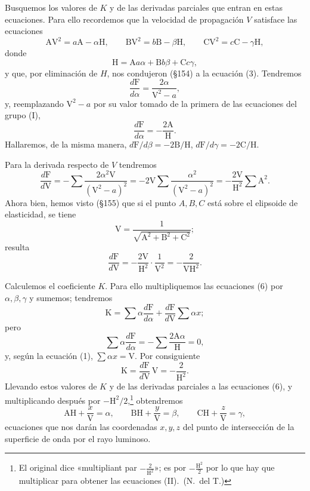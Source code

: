 Busquemos los valores de $K$ y de las
derivadas parciales que entran en estas ecuaciones. Para ello recordemos
que la velocidad de propagación $V$ satisface las ecuaciones
\begin{equation}
\mathrm{AV}^2=a\mathrm A-\alpha\mathrm H,\qquad
\mathrm{BV}^2=b\mathrm B-\beta\mathrm H,\qquad
\mathrm{CV}^2=c\mathrm C-\gamma\mathrm H,
\tag{I}
\end{equation}
donde
\[
\mathrm H=\mathrm Aa\alpha+\mathrm Bb\beta+\mathrm Cc\gamma,
\]
y que, por eliminación de $H$, nos condujeron (§154) a la ecuación (3).
Tendremos
\[
\frac{d\mathrm F}{d\alpha}=\frac{2\alpha}{\mathrm V^2-a},
\]
y, reemplazando $\mathrm V^2-a$ por su valor tomado de la primera de las
ecuaciones del grupo (I),
\[
\frac{d\mathrm F}{d\alpha}=-\frac{2\mathrm A}{\mathrm H}.
\]
Hallaremos, de la misma manera, $d\mathrm F/d\beta=-2\mathrm B/\mathrm H$,
$d\mathrm F/d\gamma=-2\mathrm C/\mathrm H$.

Para la derivada respecto de $V$ tendremos
\[
\frac{d\mathrm F}{d\mathrm V}=-\sum\frac{2\alpha^2\mathrm V}{(\mathrm V^2-a)^2}
=-2\mathrm V\sum\frac{\alpha^2}{(\mathrm V^2-a)^2}
=-\frac{2\mathrm V}{\mathrm H^2}\sum\mathrm A^2.
\]
Ahora bien, hemos visto (§155) que si el punto $A,B,C$ está sobre el
elipsoide de elasticidad, se tiene
\[
\mathrm V=\frac{1}{\sqrt{\mathrm A^2+\mathrm B^2+\mathrm C^2}};
\]
resulta
\[
\frac{d\mathrm F}{d\mathrm V}=-\frac{2\mathrm V}{\mathrm H^2}\cdot\frac{1}{\mathrm V^2}=-\frac{2}{\mathrm{VH}^2}.
\]

Calculemos el coeficiente $K$. Para ello multipliquemos las ecuaciones (6)
por $\alpha,\beta,\gamma$ y sumemos; tendremos
\[
\mathrm K=\sum\alpha\frac{d\mathrm F}{d\alpha}+\frac{d\mathrm F}{d\mathrm V}\sum\alpha x;
\]
pero
\[
\sum\alpha\frac{d\mathrm F}{d\alpha}=-\sum\frac{2\mathrm A\alpha}{\mathrm H}=0,
\]
y, según la ecuación (1), $\sum\alpha x=\mathrm V$. Por consiguiente
\[
\mathrm K=\frac{d\mathrm F}{d\mathrm V}\,\mathrm V=-\frac{2}{\mathrm H^2}.
\]
Llevando estos valores de $K$ y de las derivadas parciales a las
ecuaciones (6), y multiplicando después por $-\mathrm H^2/2$,\footnote{El
original dice «multipliant par $-\frac{2}{\mathrm H^2}$»; es por
$-\frac{\mathrm H^2}{2}$ por lo que hay que multiplicar para obtener las
ecuaciones (II).~(N.~del T.)}
obtendremos
\begin{equation}
\mathrm{AH}+\frac{x}{\mathrm V}=\alpha,\qquad
\mathrm{BH}+\frac{y}{\mathrm V}=\beta,\qquad
\mathrm{CH}+\frac{z}{\mathrm V}=\gamma,
\tag{II}
\end{equation}
ecuaciones que nos darán las coordenadas $x,y,z$ del punto de
intersección de la superficie de onda por el rayo luminoso.

